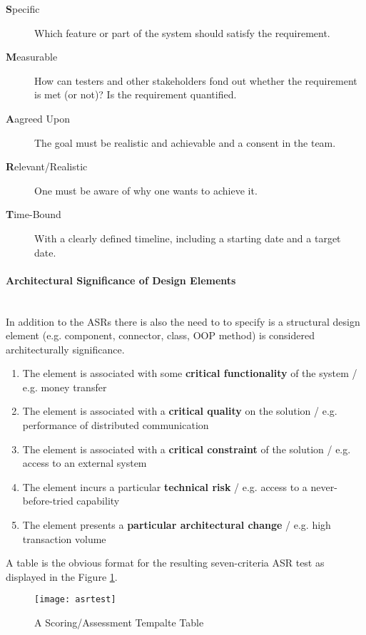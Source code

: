 \begin{description}
	\item [\textbf{S}pecific] Which feature or part of the system should satisfy the requirement.
	\item [\textbf{M}easurable] How can testers and other stakeholders fond out whether the requirement is met (or not)? Is the requirement quantified.
	\item [\textbf{A}agreed Upon] The goal must be realistic and achievable and a consent in the team.
	\item [\textbf{R}elevant/Realistic] One must be aware of why one wants to achieve it. 
	\item [\textbf{T}ime-Bound] With a clearly defined timeline, including a starting date and a target date. 
\end{description}

\paragraph{Architectural Significance of Design Elements} \hfill \\
In addition to the ASRs there is also the need to to specify is a structural design element (e.g. component, connector, class, OOP method) is considered architecturally significance.

\begin{enumerate}
	\item The element is associated with some \textbf{critical functionality} of the system / e.g. money transfer
	\item The element is associated with a \textbf{critical quality} on the solution / e.g. performance of distributed communication
	\item The element is associated with a \textbf{critical constraint} of the solution / e.g. access to an external system
	\item The element incurs a particular  \textbf{technical risk} / e.g. access to a never-before-tried capability 
	\item The element presents a \textbf{particular architectural change} / e.g. high transaction volume
\end{enumerate}

A table is the obvious format for the resulting seven-criteria ASR test as displayed in the Figure \ref{fig:asrtest}.

\begin{figure}[H]
  	\center
  	\texttt{[image: asrtest]}
  	\caption{A Scoring/Assessment Tempalte Table}
  	\label{fig:asrtest}
\end{figure}


